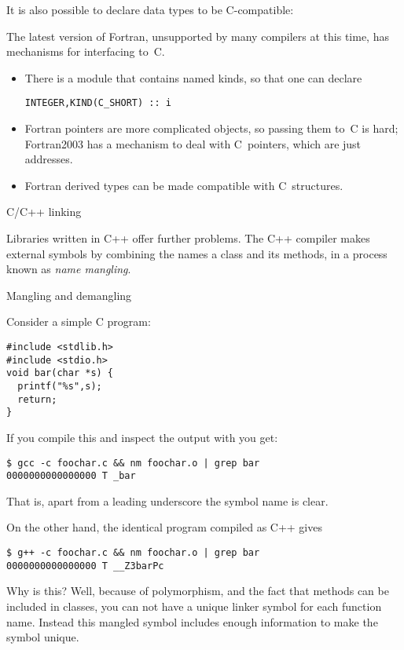 It is also possible to declare data types to be C-compatible:


The latest version of Fortran, unsupported by many compilers at this
time, has mechanisms for interfacing to~C.
\begin{itemize}
\item There is a module that contains named kinds, so that one can declare
\begin{verbatim}
INTEGER,KIND(C_SHORT) :: i
\end{verbatim}
\item Fortran pointers are more complicated objects, so passing them
  to~C is hard; Fortran2003 has a mechanism to deal with C~pointers,
  which are just addresses.
\item Fortran derived types can be made compatible with C~structures.
\end{itemize}


 {C/C++ linking}

Libraries written in C++ offer further problems.
The C++ compiler makes external symbols by combining
the names a class and its methods, in a process known
as \emph{name mangling}.

 {Mangling and demangling}

Consider a simple C program:
\begin{verbatim}
#include <stdlib.h>
#include <stdio.h>
void bar(char *s) {
  printf("%s",s);
  return;
}
\end{verbatim}
If you compile this and inspect the output with  you get:
\begin{verbatim}
$ gcc -c foochar.c && nm foochar.o | grep bar
0000000000000000 T _bar
\end{verbatim}
That is, apart from a leading underscore the symbol name is clear.

On the other hand, the identical program compiled as C++ gives
\begin{verbatim}
$ g++ -c foochar.c && nm foochar.o | grep bar
0000000000000000 T __Z3barPc
\end{verbatim}

Why is this? Well,
because of polymorphism, and the fact that methods
can be included in classes,
you can not have a unique linker symbol for each function name.
Instead this mangled symbol includes enough information
to make the symbol unique.

